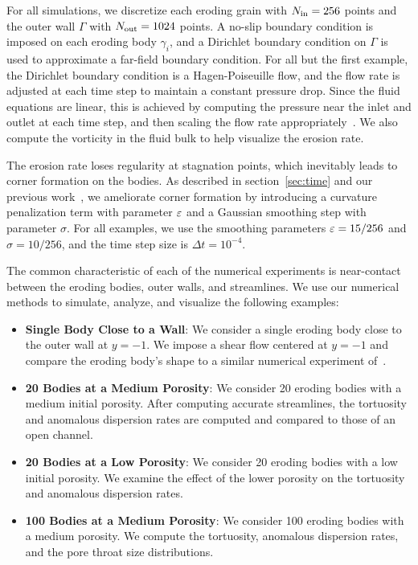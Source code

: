 \documentclass{jfm}
\begin{document}
For all simulations, we discretize each eroding grain with $N_{\mathrm{in}} =
256$ points and the outer wall $\Gamma$ with $N_{\mathrm{out}}=1024$ points.  A
no-slip boundary condition is imposed on each eroding body $\gamma_i$,
and a Dirichlet boundary condition on $\Gamma$ is used to approximate a
far-field boundary condition. For all but the first example, the
Dirichlet boundary condition is a Hagen-Poiseuille flow, and the flow
rate is adjusted at each time step to maintain a constant pressure drop.
Since the fluid equations are linear, this is achieved by computing the
pressure near the inlet and outlet at each time step, and then scaling
the flow rate appropriately~\citep{qua-moo2018}. We also compute the
vorticity in the fluid bulk to help visualize the erosion rate.

The erosion rate loses regularity at stagnation points, which inevitably
leads to corner formation on the bodies.  As described in
section~\ref{sec:time} and our previous work~\citep{qua-moo2018}, we
ameliorate corner formation by introducing a curvature penalization term
with parameter $\varepsilon$ and a Gaussian smoothing step with parameter
$\sigma$.  For all examples, we use the smoothing parameters
$\varepsilon=15/256$ and $\sigma=10/256$, and the time step size is $\Delta t =
10^{-4}$.

The common characteristic of each of the numerical experiments is
near-contact between the eroding bodies, outer walls, and streamlines.
We use our numerical methods to simulate, analyze, and visualize the
following examples:
\begin{itemize}
  \item{\bf Single Body Close to a Wall}: We consider a single eroding
  body close to the outer wall at $y=-1$.  We impose a shear flow
  centered at $y=-1$ and compare the eroding body's shape to a similar
  numerical experiment of~\citet{mit-spa2017}.

  \item{\bf 20 Bodies at a Medium Porosity}: We consider 20 eroding
  bodies with a medium initial porosity.  After computing accurate
  streamlines, the tortuosity and anomalous dispersion rates are
  computed and compared to those of an open channel.

  \item{\bf 20 Bodies at a Low Porosity}: We consider 20 eroding bodies
  with a low initial porosity.  We examine the effect of the lower
  porosity on the tortuosity and anomalous dispersion rates.

  \item{\bf 100 Bodies at a Medium Porosity}: We consider 100 eroding
  bodies with a medium porosity.  We compute the tortuosity, anomalous
  dispersion rates, and the pore throat size distributions.
\end{itemize}
\end{document}
